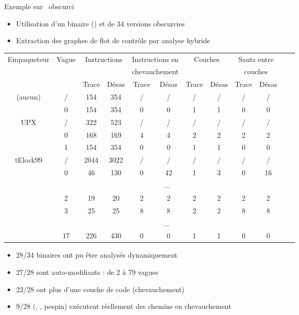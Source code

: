 \documentclass{beamer}
\begin{document}
\begin{frame}{Exemple sur \hostname\ obscurci}
\begin{itemize}
 \item Utilisation d'un binaire (\hostname) et de 34 versions obscurcies
 \item Extraction des graphes de flot de contrôle par analyse hybride
\end{itemize}

\pause
\begin{tiny}
\begin{longtable}{|c|c|c|c|c|c|c|c|c|c|c|c|}
\hline
Empaqueteur & Vague & \multicolumn{2}{c|}{Instructions} & \multicolumn{2}{c|}{Instructions en} & \multicolumn{2}{c|}{Couches} & \multicolumn{2}{c|}{Sauts entre}\\
 &  & \multicolumn{2}{c|}{} & \multicolumn{2}{c|}{chevauchement} & \multicolumn{2}{c|}{} & \multicolumn{2}{c|}{couches}\\
  &   & Trace & Désas & Trace & Désas & Trace & Désas & Trace & Désas\\
\hline
\endhead
\rowcolor{lightgray}(aucun) & / & 154 & 354 & / & / & / & / & / & /\\
  & 0 & 154 & 354 & 0 & 0 & 1 & 1 & 0 & 0\\
\hline
\hline
\rowcolor{lightgray}UPX & / & 322 & 523 & / & / & / & / & / & /\\
  & 0 & 168 & 169 & 4 & 4 & 2 & 2 & 2 & 2\\
  & 1 & 154 & 354 & 0 & 0 & 1 & 1 & 0 & 0\\
\hline
\rowcolor{lightgray}tElock99 & / & 2044 & 3022 & / & / & / & / & / & /\\
  & 0 & 46 & 130 & 0 & 42 & 1 & 3 & 0 & 16\\
  & \multicolumn{9}{c|}{...}\\
  & 2 & 19 & 20 & 2 & 2 & 2 & 2 & 2 & 2\\
  & 3 & 25 & 25 & 8 & 8 & 2 & 2 & 8 & 8\\
  & \multicolumn{9}{c|}{...}\\
  & 17 & 226 & 430 & 0 & 0 & 1 & 1 & 0 & 0\\
\hline
\end{longtable}
\end{tiny}

\pause
\begin{itemize}
 \item 28/34 binaires ont pu être analysés dynamiquement
 \item 27/28 sont auto-modifiants : de 2 à 79 vagues
 \item 22/28 ont plus d'une couche de code (chevauchement)
 \item 9/28 (\telock, \upx, pespin) exécutent réellement des chemins en chevauchement
\end{itemize}
\end{frame}
\end{document}
